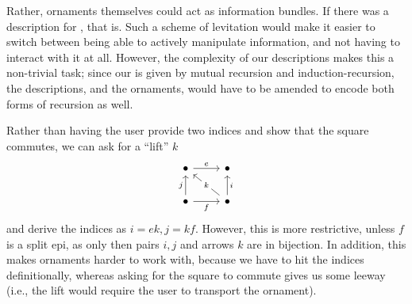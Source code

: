 \begin{remark}
    Rather, ornaments themselves could act as information bundles. If there was a description for , that is. Such a scheme of levitation would make it easier to switch between being able to actively manipulate information, and not having to interact with it at all. However, the complexity of our descriptions makes this a non-trivial task; since our  is given by mutual recursion and induction-recursion, the descriptions, and the ornaments, would have to be amended to encode both forms of recursion as well.
\end{remark} %

\begin{remark}\label{rem:orn-lift}
    Rather than having the user provide two indices and show that the square commutes, we can ask for a ``lift'' $k$
    \[\begin{tikzcd}
        \bullet & \bullet \\
        \bullet & \bullet
        \arrow["e", from=1-1, to=1-2]
        \arrow["f"', from=2-1, to=2-2]
        \arrow["j", from=2-1, to=1-1]
        \arrow["i"', from=2-2, to=1-2]
        \arrow["k"{description}, from=2-2, to=1-1]
    \end{tikzcd}\]
    and derive the indices as $i = ek, j = kf$. However, this is more restrictive, unless $f$ is a split epi, as only then pairs $i,j$ and arrows $k$ are in bijection. In addition, this makes ornaments harder to work with, because we have to hit the indices definitionally, whereas asking for the square to commute gives us some leeway (i.e., the lift would require the user to transport the ornament). 
\end{remark}


